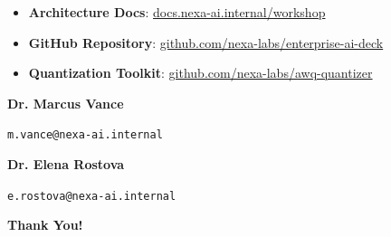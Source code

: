 \documentclass[20pt,landscape,a4paper]{foils}
\begin{document}
\noindent
\begin{minipage}[t]{0.58\textwidth}
  \begin{tcolorbox}[accentbox, title={\textcolor{NavyPrimary}{\large \faGlobe~ \textbf{Documentation \& Repositories}}}, fonttitle=\bfseries]
    \begin{itemize}[leftmargin=14pt, label=\textcolor{TealAccent}{\small\faCheck}]
      \item \textbf{Architecture Docs}: \href{https://docs.nexa-ai.internal/workshop}{docs.nexa-ai.internal/workshop}
      \item \textbf{GitHub Repository}: \href{https://github.com/nexa-labs/enterprise-ai-deck}{github.com/nexa-labs/enterprise-ai-deck}
      \item \textbf{Quantization Toolkit}: \href{https://github.com/nexa-labs/awq-quantizer}{github.com/nexa-labs/awq-quantizer}
    \end{itemize}
  \end{tcolorbox}
\end{minipage}%
\hfill
\begin{minipage}[t]{0.38\textwidth}
  \begin{tcolorbox}[amberbox, title={\textcolor{NavyPrimary}{\large \faEnvelope~ \textbf{Contact Leads}}}, fonttitle=\bfseries]
    \small
    \textbf{Dr. Marcus Vance} \par
    \texttt{m.vance@nexa-ai.internal} \par\vspace{4pt}
    \textbf{Dr. Elena Rostova} \par
    \texttt{e.rostova@nexa-ai.internal} \par\vspace{8pt}
    \centering
    \textcolor{NavyPrimary}{\large\bfseries Thank You!}
  \end{tcolorbox}
\end{minipage}
\end{document}
